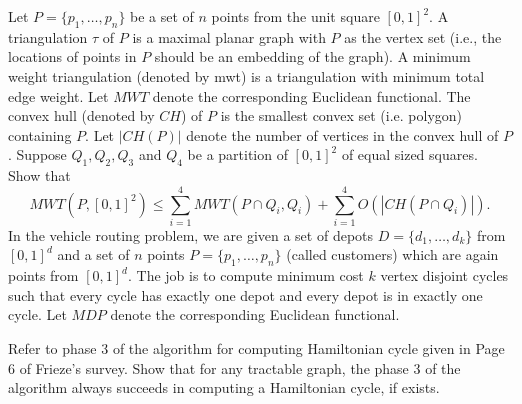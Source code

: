 \documentclass[solution,12pt]{exam}
\begin{document}
\begin{questions}
\question[8]   Let $P = \{p_1,\ldots, p_n\}$ be a set of $n$ points from the unit square $[0,1]^2$. A triangulation $\tau$ of $P$ is a maximal planar graph with $P$ as the vertex set (i.e., the locations of points in $P$ should be an embedding of the graph). A minimum weight triangulation (denoted by mwt) is a triangulation with minimum total edge weight.  Let $MWT$ denote the corresponding Euclidean functional. The convex hull (denoted by $CH$) of $P$ is the smallest convex set (i.e. polygon) containing $P$. Let $|CH(P)|$ denote the number of vertices in the convex hull of $P$.  Suppose $Q_1,Q_2, Q_3$ and $Q_4$ be a partition of $[0,1]^2$ of equal sized squares. Show that
$$ MWT(P, [0,1]^2) \le \sum_{i=1}^4 MWT(P\cap Q_i, Q_i) + \sum_{i=1}^4 O(|CH(P\cap Q_i)|).$$
\question[16] In the vehicle routing problem, we are given a set of depots $D = \{d_1,\ldots, d_k\}$ from $[0,1]^d$ and a set of $n$ points  $ P =\{p_1,\ldots, p_n\}$  (called customers) which are again  points from $[0,1]^d$. The job is to compute minimum cost $k$ vertex disjoint cycles such that every cycle has exactly one depot and every depot is in exactly one cycle.  Let $MDP$ denote the corresponding Euclidean functional. 
 



\question[6] Refer to phase 3 of the algorithm for computing Hamiltonian cycle given in Page 6 of  Frieze's survey.   Show that for any tractable graph, the phase 3 of the algorithm always succeeds in computing a Hamiltonian cycle, if exists. 
 

\end{questions}
\end{document}
